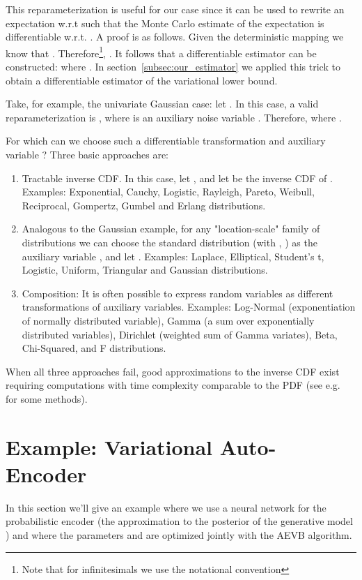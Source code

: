 \documentclass{article} \usepackage{nips13submit_e,times}
\theoremstyle{definition}
\theoremstyle{definition}
\begin{document}
This reparameterization is useful for our case since it can be used to rewrite an expectation w.r.t  such that the Monte Carlo estimate of the expectation is differentiable w.r.t. . A proof is as follows. Given the deterministic mapping  we know that . Therefore\footnote{Note that for infinitesimals we use the notational convention }, . It follows that a differentiable estimator can be constructed:  where . In section~\ref{subsec:our_estimator} we applied this trick to obtain a differentiable estimator of the variational lower bound.

Take, for example, the univariate Gaussian case: let . In this case, a valid reparameterization is , where  is an auxiliary noise variable . Therefore,  where .

For which  can we choose such a differentiable transformation  and auxiliary variable ? Three basic approaches are:
\begin{enumerate}
\item Tractable inverse CDF. In this case, let , and let  be the inverse CDF of . Examples: Exponential, Cauchy, Logistic, Rayleigh, Pareto, Weibull, Reciprocal, Gompertz, Gumbel and Erlang distributions.

\item Analogous to the Gaussian example, for any "location-scale" family of distributions we can choose the standard distribution (with , ) as the auxiliary variable , and let . Examples: Laplace, Elliptical, Student's t, Logistic, Uniform, Triangular and Gaussian distributions.

\item Composition: It is often possible to express random variables as different transformations of auxiliary variables. Examples: Log-Normal (exponentiation of normally distributed variable), Gamma (a sum over exponentially distributed variables), Dirichlet (weighted sum of Gamma variates), Beta, Chi-Squared, and F distributions.
\end{enumerate}

When all three approaches fail, good approximations to the inverse CDF exist requiring computations with time complexity comparable to the PDF (see e.g. ~\cite{devroye1986sample} for some methods).

\section{Example: Variational Auto-Encoder}
\label{sec:example}
In this section we'll give an example where we use a neural network for the probabilistic encoder  (the approximation to the posterior of the generative model ) and where the parameters  and  are optimized jointly with the AEVB algorithm.
\end{document}
